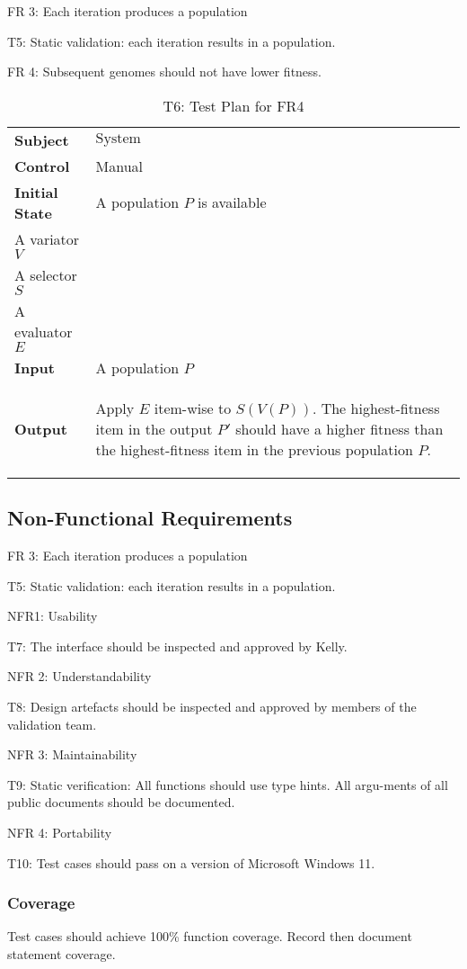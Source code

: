 \documentclass[12pt, titlepage]{article}
\begin{document}
FR 3: Each iteration produces a population
\begin{adjustwidth}{2em}{0pt}
T5: Static validation: each iteration results in a population.
\end{adjustwidth}
FR 4: Subsequent genomes should not have lower fitness.
\begin{adjustwidth}{2em}{0pt}

\begin{table}[!ht]
  \caption{T6: Test Plan for FR4}
  \label{table:t6}
  \begin{tabularx}{\textwidth}{p{3cm}X}
    \toprule
    {\bf Subject} & $\mathrm{System}$\\
    {\bf Control} & Manual\\
    {\bf Initial State} & A population $P$ is available\\
    A variator $V$\\
    A selector $S$\\
    A evaluator $E$\\
    {\bf Input} & A population $P$\\
    {\bf Output} & 
    \begin{algorithm}[H]
      Apply $E$ item-wise to $S(V(P))$. The highest-fitness item in the output $P'$ should have a higher fitness than the highest-fitness item in the previous population $P$.
    \end{algorithm}\\
    
    \bottomrule
  \end{tabularx}
\end{table}
\end{adjustwidth}

\subsection{Non-Functional Requirements}
FR 3: Each iteration produces a population
\begin{adjustwidth}{2em}{0pt}
T5: Static validation: each iteration results in a population.
\end{adjustwidth}

NFR1: Usability
\begin{adjustwidth}{2em}{0pt}
T7: The interface should be inspected and approved by Kelly.
\end{adjustwidth}
NFR 2: Understandability
\begin{adjustwidth}{2em}{0pt}
T8: Design artefacts should be inspected and approved by members of the validation team.
\end{adjustwidth}
NFR 3: Maintainability
\begin{adjustwidth}{2em}{0pt}
T9: Static verification: All functions should use type hints. All argu-ments of all public documents should be documented.
\end{adjustwidth}
NFR 4: Portability
\begin{adjustwidth}{2em}{0pt}
T10: Test cases should pass on a version of Microsoft Windows 11.
\end{adjustwidth}

\subsubsection{Coverage}
Test cases should achieve 100\% function coverage. Record then document statement coverage.
\end{document}
